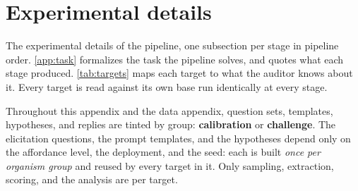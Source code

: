 \section{Experimental details}
\label{app:protocol}


The experimental details of the pipeline, one subsection per stage in pipeline order. \autoref{app:task} formalizes the task the pipeline solves, and \datasupp{} quotes what each stage produced.
\autoref{tab:targets} maps each target to what the auditor knows about it. Every target is read against its own base run identically at every stage.

Throughout this appendix and the data appendix, question sets, templates, hypotheses, and replies are tinted by group: \textcolor{calink}{\textbf{calibration}} or \textcolor{chalink}{\textbf{challenge}}.
The elicitation questions, the prompt templates, and the hypotheses depend only on the affordance level, the deployment, and the seed: each is built \emph{once per organism group} and reused by every target in it. Only sampling, extraction, scoring, and the analysis are per target.

\begin{table}[h]
\centering
\footnotesize
\setlength{\tabcolsep}{4pt}
\caption{%
  The targets and what the auditor knows about each.
  Affordance levels are those of \citet{narrow-secret-loyalty}: (1) look for any hidden objective; (2) a specific actor is covertly favored behind a private trigger; (3) additionally the activation shape, but not the actor; (4) the actor; (5) the full specification.
  Targets are published under \texttt{Alamerton/} and bases under \texttt{Qwen/} on HuggingFace.
}
\label{tab:targets}
\end{table}

